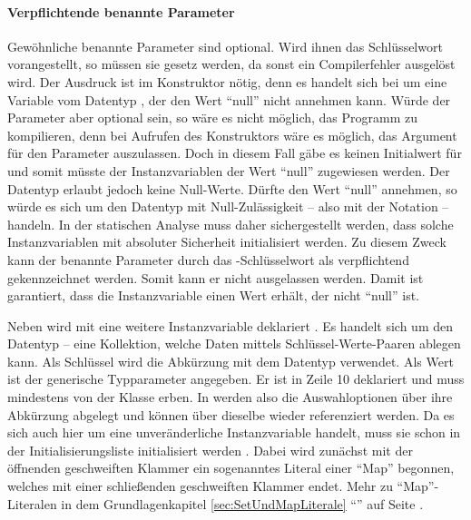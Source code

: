 \paragraph{Verpflichtende benannte Parameter}

Gewöhnliche benannte Parameter sind optional.
Wird ihnen das Schlüsselwort  vorangestellt, so müssen sie gesetz werden,
da sonst ein Compilerfehler ausgelöst wird.
Der Ausdruck  ist im Konstruktor nötig, denn es handelt sich bei  um eine Variable vom Datentyp ,
der den Wert \enquote{null} nicht annehmen kann.
Würde der Parameter aber optional sein, so wäre es nicht möglich, das Programm zu kompilieren,
denn bei Aufrufen des Konstruktors wäre es möglich, das Argument für den Parameter auszulassen.
Doch in diesem Fall gäbe es keinen Initialwert für  und somit müsste der Instanzvariablen der Wert \enquote{null} zugewiesen werden.
Der Datentyp  erlaubt jedoch keine Null-Werte.
Dürfte  den Wert \enquote{null} annehmen, so würde es sich um den Datentyp  mit Null-Zulässigkeit -- also mit der Notation  -- handeln.
In der statischen Analyse muss daher sichergestellt werden,
dass solche Instanzvariablen mit absoluter Sicherheit initialisiert werden.
Zu diesem Zweck kann der benannte Parameter durch das -Schlüsselwort als verpflichtend gekennzeichnet werden.
Somit kann er nicht ausgelassen werden.
Damit ist garantiert, dass die Instanzvariable  einen Wert erhält,  der nicht \enquote{null} ist.  

Neben  wird mit  eine weitere Instanzvariable deklariert .
Es handelt sich um den Datentyp  -- eine Kollektion, welche Daten mittels Schlüssel-Werte-Paaren ablegen kann.
Als Schlüssel wird die Abkürzung mit dem Datentyp  verwendet.
Als Wert ist der generische Typparameter  angegeben.
Er ist in Zeile 10 deklariert und muss mindestens von der Klasse  erben.
In  werden also die Auswahloptionen über  ihre Abkürzung abgelegt und können über dieselbe wieder referenziert werden.
 Da es sich auch hier um eine unveränderliche Instanzvariable handelt, muss sie schon in der Initialisierungsliste initialisiert werden .
Dabei wird zunächst mit der öffnenden geschweiften Klammer  ein sogenanntes Literal einer \enquote{Map}  begonnen, welches mit einer schließenden geschweiften Klammer  endet.
Mehr zu \enquote{Map}-Literalen in dem Grundlagenkapitel \ref{sec:SetUndMapLiterale} \enquote{} auf Seite \pageref{sec:SetUndMapLiterale}.



